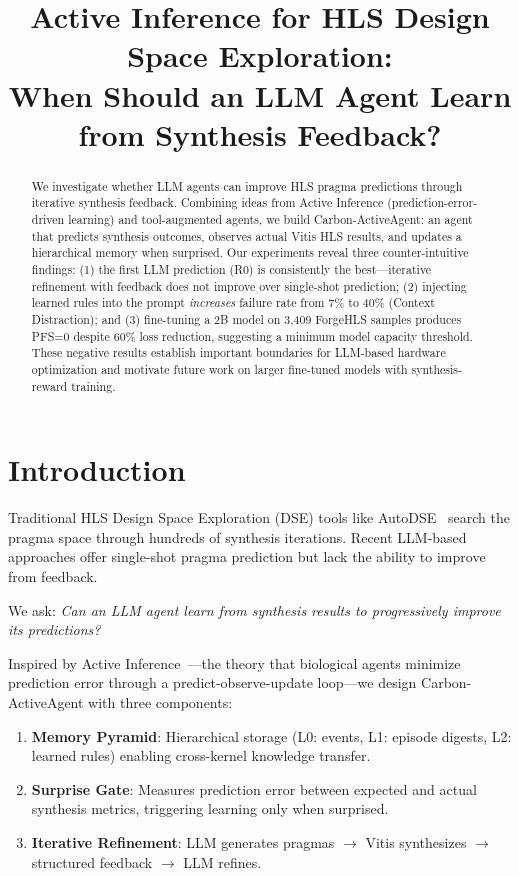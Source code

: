 \documentclass[conference]{IEEEtran}
\title{Active Inference for HLS Design Space Exploration:\\
When Should an LLM Agent Learn from Synthesis Feedback?}
\author{
\IEEEauthorblockN{William Chen}
\IEEEauthorblockA{National Taiwan University}
}
\begin{document}
\maketitle

\begin{abstract}
We investigate whether LLM agents can improve HLS pragma predictions
through iterative synthesis feedback. Combining ideas from Active
Inference (prediction-error-driven learning) and tool-augmented agents,
we build Carbon-ActiveAgent: an agent that predicts synthesis outcomes,
observes actual Vitis HLS results, and updates a hierarchical memory
when surprised. Our experiments reveal three counter-intuitive findings:
(1) the first LLM prediction (R0) is consistently the best---iterative
refinement with feedback does not improve over single-shot prediction;
(2) injecting learned rules into the prompt \emph{increases} failure
rate from 7\% to 40\% (Context Distraction); and (3) fine-tuning a 2B
model on 3,409 ForgeHLS samples produces PFS=0 despite 60\% loss
reduction, suggesting a minimum model capacity threshold. These
negative results establish important boundaries for LLM-based hardware
optimization and motivate future work on larger fine-tuned models
with synthesis-reward training.
\end{abstract}

\section{Introduction}

Traditional HLS Design Space Exploration (DSE) tools like
AutoDSE~\cite{autodse} search the pragma space through hundreds
of synthesis iterations. Recent LLM-based approaches offer single-shot
pragma prediction but lack the ability to improve from feedback.

We ask: \emph{Can an LLM agent learn from synthesis results to
progressively improve its predictions?}

Inspired by Active Inference~\cite{friston2010}---the theory that
biological agents minimize prediction error through a
predict-observe-update loop---we design Carbon-ActiveAgent with three
components:

\begin{enumerate}
    \item \textbf{Memory Pyramid}: Hierarchical storage (L0: events,
    L1: episode digests, L2: learned rules) enabling cross-kernel
    knowledge transfer.
    \item \textbf{Surprise Gate}: Measures prediction error between
    expected and actual synthesis metrics, triggering learning only
    when surprised.
    \item \textbf{Iterative Refinement}: LLM generates pragmas $\to$
    Vitis synthesizes $\to$ structured feedback $\to$ LLM refines.
\end{enumerate}
\end{document}
